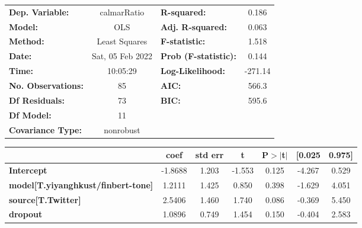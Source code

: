 \begin{center}
\begin{tabular}{lclc}
\toprule
\textbf{Dep. Variable:}                    &   calmarRatio    & \textbf{  R-squared:         } &     0.186   \\
\textbf{Model:}                            &       OLS        & \textbf{  Adj. R-squared:    } &     0.063   \\
\textbf{Method:}                           &  Least Squares   & \textbf{  F-statistic:       } &     1.518   \\
\textbf{Date:}                             & Sat, 05 Feb 2022 & \textbf{  Prob (F-statistic):} &    0.144    \\
\textbf{Time:}                             &     10:05:29     & \textbf{  Log-Likelihood:    } &   -271.14   \\
\textbf{No. Observations:}                 &          85      & \textbf{  AIC:               } &     566.3   \\
\textbf{Df Residuals:}                     &          73      & \textbf{  BIC:               } &     595.6   \\
\textbf{Df Model:}                         &          11      & \textbf{                     } &             \\
\textbf{Covariance Type:}                  &    nonrobust     & \textbf{                     } &             \\
\bottomrule
\end{tabular}
\begin{tabular}{lcccccc}
                                           & \textbf{coef} & \textbf{std err} & \textbf{t} & \textbf{P$> |$t$|$} & \textbf{[0.025} & \textbf{0.975]}  \\
\midrule
\textbf{Intercept}                         &      -1.8688  &        1.203     &    -1.553  &         0.125        &       -4.267    &        0.529     \\
\textbf{model[T.yiyanghkust/finbert-tone]} &       1.2111  &        1.425     &     0.850  &         0.398        &       -1.629    &        4.051     \\
\textbf{source[T.Twitter]}                 &       2.5406  &        1.460     &     1.740  &         0.086        &       -0.369    &        5.450     \\
\textbf{dropout}                           &       1.0896  &        0.749     &     1.454  &         0.150        &       -0.404    &        2.583     \\

\end{tabular}
\end{center}

